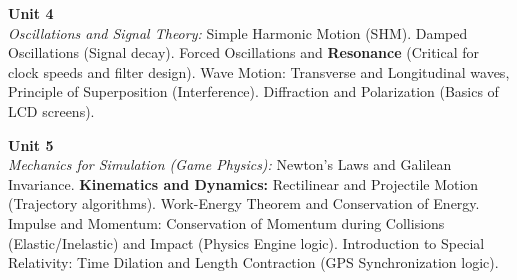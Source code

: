 \vspace{0.3cm}

\noindent\textbf{Unit 4} \\
\textit{Oscillations and Signal Theory:} Simple Harmonic Motion (SHM). Damped Oscillations (Signal decay). Forced Oscillations and \textbf{Resonance} (Critical for clock speeds and filter design). Wave Motion: Transverse and Longitudinal waves, Principle of Superposition (Interference). Diffraction and Polarization (Basics of LCD screens).

\vspace{0.3cm}

\noindent\textbf{Unit 5} \\
\textit{Mechanics for Simulation (Game Physics):} Newton’s Laws and Galilean Invariance. \textbf{Kinematics and Dynamics:} Rectilinear and Projectile Motion (Trajectory algorithms). Work-Energy Theorem and Conservation of Energy. Impulse and Momentum: Conservation of Momentum during Collisions (Elastic/Inelastic) and Impact (Physics Engine logic). Introduction to Special Relativity: Time Dilation and Length Contraction (GPS Synchronization logic).

\newpage
{}